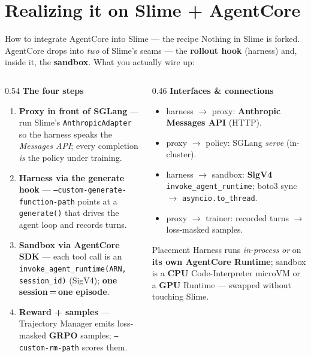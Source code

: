 \documentclass[aspectratio=169]{beamer}
\begin{document}
\section{Realizing it on Slime + AgentCore}

\begin{frame}{How to integrate AgentCore into Slime --- the recipe}
  \footnotesize Nothing in Slime is forked. AgentCore drops into \emph{two} of Slime's seams ---
  the \textbf{rollout hook} (harness) and, inside it, the \textbf{sandbox}. What you actually wire up:
  \vspace{0.2em}
  \begin{columns}[T]
    \begin{column}{0.54\textwidth}
      \textbf{The four steps}
      \begin{enumerate}\setlength\itemsep{0.15em}
        \item[\textbf{1}] \textbf{Proxy in front of SGLang} --- run Slime's \texttt{AnthropicAdapter}
          so the harness speaks the \emph{Messages API}; every completion \emph{is} the policy under training.
        \item[\textbf{2}] \textbf{Harness via the generate hook} ---
          \texttt{--custom-generate-function-path} points at a \texttt{generate()} that drives the
          agent loop and records turns.
        \item[\textbf{3}] \textbf{Sandbox via AgentCore SDK} --- each tool call is an
          \texttt{invoke\_agent\_runtime(ARN, session\_id)} (SigV4); \textbf{one session\,=\,one episode}.
        \item[\textbf{4}] \textbf{Reward + samples} --- Trajectory Manager emits loss-masked
          \textbf{GRPO} samples; \texttt{--custom-rm-path} scores them.
      \end{enumerate}
    \end{column}
    \begin{column}{0.46\textwidth}
      \textbf{Interfaces \& connections}
      \begin{itemize}\setlength\itemsep{0.12em}
        \item harness $\to$ proxy: \textbf{Anthropic Messages API} (HTTP).
        \item proxy $\to$ policy: SGLang \emph{serve} (in-cluster).
        \item harness $\to$ sandbox: \textbf{SigV4} \texttt{invoke\_agent\_runtime}; boto3 sync $\to$ \texttt{asyncio.to\_thread}.
        \item proxy $\to$ trainer: recorded turns $\to$ loss-masked samples.
      \end{itemize}
      \begin{block}{Placement}
        \scriptsize Harness runs \emph{in-process} \emph{or} on \textbf{its own AgentCore Runtime}; sandbox is a
        \textbf{CPU} Code-Interpreter microVM or a \textbf{GPU} Runtime --- swapped without touching Slime.
      \end{block}
    \end{column}
  \end{columns}
\end{frame}
\end{document}
